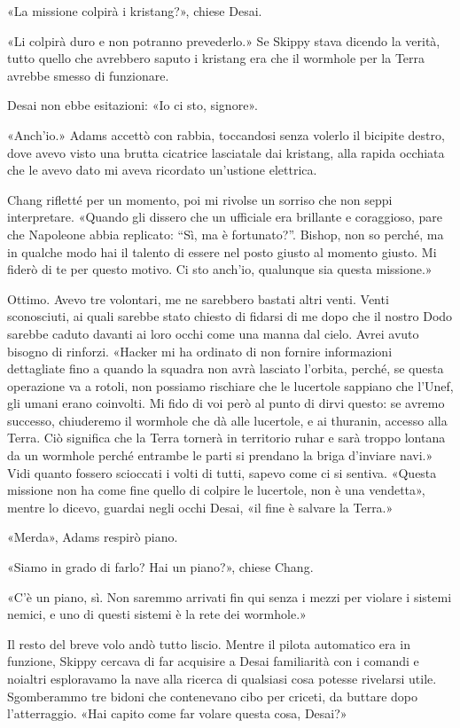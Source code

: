 «La missione colpirà i kristang?», chiese Desai.

«Li colpirà duro e non potranno prevederlo.» Se Skippy stava dicendo la
verità, tutto quello che avrebbero saputo i kristang era che il wormhole
per la Terra avrebbe smesso di funzionare.

Desai non ebbe esitazioni: «Io ci sto, signore».

«Anch'io.» Adams accettò con rabbia, toccandosi senza volerlo il
bicipite destro, dove avevo visto una brutta cicatrice lasciatale dai
kristang, alla rapida occhiata che le avevo dato mi aveva ricordato
un'ustione elettrica.

Chang rifletté per un momento, poi mi rivolse un sorriso che non seppi
interpretare. «Quando gli dissero che un ufficiale era brillante e
coraggioso, pare che Napoleone abbia replicato: ``Sì, ma è fortunato?''.
Bishop, non so perché, ma in qualche modo hai il talento di essere nel
posto giusto al momento giusto. Mi fiderò di te per questo motivo. Ci
sto anch'io, qualunque sia questa missione.»

Ottimo. Avevo tre volontari, me ne sarebbero bastati altri venti. Venti
sconosciuti, ai quali sarebbe stato chiesto di fidarsi di me dopo che il
nostro Dodo sarebbe caduto davanti ai loro occhi come una manna dal
cielo. Avrei avuto bisogno di rinforzi. «Hacker mi ha ordinato di non
fornire informazioni dettagliate fino a quando la squadra non avrà
lasciato l'orbita, perché, se questa operazione va a rotoli, non
possiamo rischiare che le lucertole sappiano che l'Unef, gli umani erano
coinvolti. Mi fido di voi però al punto di dirvi questo: se avremo
successo, chiuderemo il wormhole che dà alle lucertole, e ai thuranin,
accesso alla Terra. Ciò significa che la Terra tornerà in territorio
ruhar e sarà troppo lontana da un wormhole perché entrambe le parti si
prendano la briga d'inviare navi.» Vidi quanto fossero scioccati i volti
di tutti, sapevo come ci si sentiva. «Questa missione non ha come fine
quello di colpire le lucertole, non è una vendetta», mentre lo dicevo,
guardai negli occhi Desai, «il fine è salvare la Terra.»

«Merda», Adams respirò piano.

«Siamo in grado di farlo? Hai un piano?», chiese Chang.

«C'è un piano, sì. Non saremmo arrivati fin qui senza i mezzi per
violare i sistemi nemici, e uno di questi sistemi è la rete dei
wormhole.»

Il resto del breve volo andò tutto liscio. Mentre il pilota automatico
era in funzione, Skippy cercava di far acquisire a Desai familiarità con
i comandi e noialtri esploravamo la nave alla ricerca di qualsiasi cosa
potesse rivelarsi utile. Sgomberammo tre bidoni che contenevano cibo per
criceti, da buttare dopo l'atterraggio. «Hai capito come far volare
questa cosa, Desai?»

